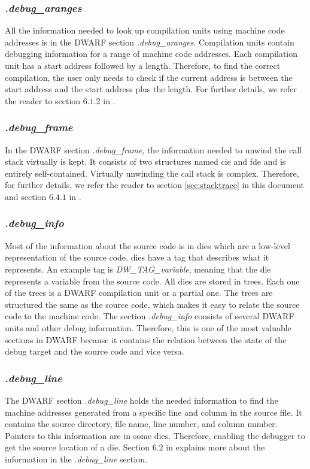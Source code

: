 \subsubsection{\emph{.debug\_aranges}}
All the information needed to look up compilation units using machine code addresses is in the \gls{DWARF} section \emph{.debug\_aranges}.
Compilation units contain debugging information for a range of machine code addresses.
Each compilation unit has a start address followed by a length.
Therefore, to find the correct compilation, the user only needs to check if the current address is between the start address and the start address plus the length.
For further details, we refer the reader to section $6.1.2$ in \cite{dwarf}.


\subsubsection{\emph{.debug\_frame}}
In the \gls{DWARF} section \emph{.debug\_frame}, the information needed to unwind the call stack virtually is kept.
It consists of two structures named \acrfull{cie} and \acrfull{fde} and is entirely self-contained.
Virtually unwinding the call stack is complex.
Therefore, for further details, we refer the reader to section \ref{sec:stacktrace} in this document and section $6.4.1$ in \cite{dwarf}.


\subsubsection{\emph{.debug\_info}}
Most of the information about the source code is in \glspl{die} which are a low-level representation of the source code.
\glspl{die} have a tag that describes what it represents.
An example tag is \emph{DW\_TAG\_variable}, meaning that the \gls{die} represents a variable from the source code.
All \glspl{die} are stored in trees.
Each one of the trees is a \gls{DWARF} compilation unit or a partial one.
The trees are structured the same as the source code, which makes it easy to relate the source code to the machine code.
The section \emph{.debug\_info} consists of several \gls{DWARF} units and other debug information.
Therefore, this is one of the most valuable sections in \gls{DWARF} because it contains the relation between the state of the debug target and the source code and vice versa.


\subsubsection{\emph{.debug\_line}}
The \gls{DWARF} section \emph{.debug\_line} holds the needed information to find the machine addresses generated from a specific line and column in the source file.
It contains the source directory, file name, line number, and column number.
Pointers to this information are in some \glspl{die}.
Therefore, enabling the debugger to get the source location of a \gls{die}.
Section $6.2$ in \cite{dwarf} explains more about the information in the \emph{.debug\_line} section.


